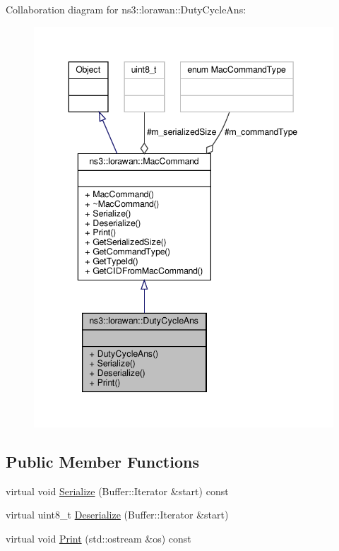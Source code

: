 Collaboration diagram for ns3\+:\+:lorawan\+:\+:Duty\+Cycle\+Ans\+:
\nopagebreak
\begin{figure}[H]
\begin{center}
\leavevmode
\includegraphics[width=343pt]{classns3_1_1lorawan_1_1DutyCycleAns__coll__graph}
\end{center}
\end{figure}
\subsection*{Public Member Functions}
\begin{DoxyCompactItemize}
\item 
virtual void \hyperlink{classns3_1_1lorawan_1_1DutyCycleAns_aff6f7b100eba491c770be23c342e5f87}{Serialize} (Buffer\+::\+Iterator \&start) const
\item 
virtual uint8\+\_\+t \hyperlink{classns3_1_1lorawan_1_1DutyCycleAns_aa3157f0326048cb774c8cfeb0f6d35a7}{Deserialize} (Buffer\+::\+Iterator \&start)
\item 
virtual void \hyperlink{classns3_1_1lorawan_1_1DutyCycleAns_a201b7cdda81f6b775f13da09ba675e26}{Print} (std\+::ostream \&os) const
\end{DoxyCompactItemize}
